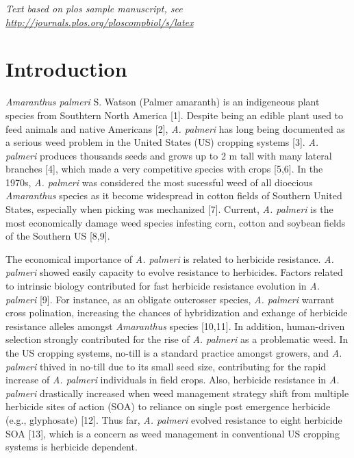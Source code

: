 \documentclass[10pt,letterpaper]{article}
\begin{document}
\linenumbers

\emph{Text based on plos sample manuscript, see
\url{http://journals.plos.org/ploscompbiol/s/latex}}

\hypertarget{introduction}{%
\section{Introduction}\label{introduction}}

\emph{Amaranthus palmeri} S. Watson (Palmer amaranth) is an indigeneous
plant species from Southtern North America {[}1{]}. Despite being an
edible plant used to feed animals and native Americans {[}2{]}, \emph{A.
palmeri} has long being documented as a serious weed problem in the
United States (US) cropping systems {[}3{]}. \emph{A. palmeri} produces
thousands seeds and grows up to 2 m tall with many lateral branches
{[}4{]}, which made a very competitive species with crops {[}5,6{]}. In
the 1970s, \emph{A. palmeri} was considered the most sucessful weed of
all dioecious \emph{Amaranthus} species as it become widespread in
cotton fields of Southern United States, especially when picking was
mechanized {[}7{]}. Current, \emph{A. palmeri} is the most economically
damage weed species infesting corn, cotton and soybean fields of the
Southern US {[}8,9{]}.

The economical importance of \emph{A. palmeri} is related to herbicide
resistance. \emph{A. palmeri} showed easily capacity to evolve
resistance to herbicides. Factors related to intrinsic biology
contributed for fast herbicide resistance evolution in \emph{A. palmeri}
{[}9{]}. For instance, as an obligate outcrosser species, \emph{A.
palmeri} warrant cross polination, increasing the chances of
hybridization and exhange of herbicide resistance alleles amongst
\emph{Amaranthus} species {[}10,11{]}. In addition, human-driven
selection strongly contributed for the rise of \emph{A. palmeri} as a
problematic weed. In the US cropping systems, no-till is a standard
practice amongst growers, and \emph{A. palmeri} thived in no-till due to
its small seed size, contributing for the rapid increase of \emph{A.
palmeri} individuals in field crops. Also, herbicide resistance in
\emph{A. palmeri} drastically increased when weed management strategy
shift from multiple herbicide sites of action (SOA) to reliance on
single post emergence herbicide (e.g., glyphosate) {[}12{]}. Thus far,
\emph{A. palmeri} evolved resistance to eight herbicide SOA {[}13{]},
which is a concern as weed management in conventional US cropping
systems is herbicide dependent.
\end{document}
